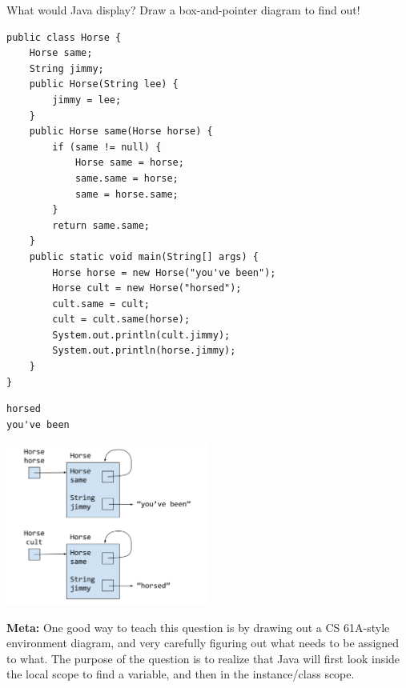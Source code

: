 \question What would Java display? Draw a box-and-pointer diagram to find out!
\begin{lstlisting}
public class Horse {
    Horse same;
    String jimmy;
    public Horse(String lee) {
        jimmy = lee;
    }
    public Horse same(Horse horse) {
        if (same != null) {
            Horse same = horse;
            same.same = horse;
            same = horse.same;
        }
        return same.same;
    }
    public static void main(String[] args) {
        Horse horse = new Horse("you've been");
        Horse cult = new Horse("horsed");
        cult.same = cult;
        cult = cult.same(horse);
        System.out.println(cult.jimmy);
        System.out.println(horse.jimmy);
    }
}
\end{lstlisting}

\begin{solution}[1.5in]
\begin{verbatim}
horsed
you've been
\end{verbatim}

\includegraphics[width=0.5\textwidth]{samehorse}

\textbf{Meta:} One good way to teach this question is by drawing out a CS 61A-style environment diagram, and very carefully figuring out what needs to be assigned to what. The purpose of the question is to realize that Java will first look inside the local scope to find a variable, and then in the instance/class scope. 
\end{solution}
